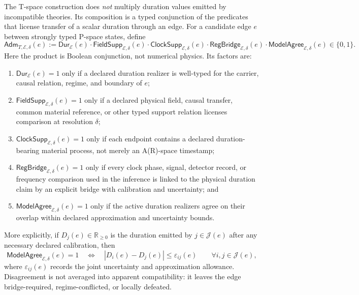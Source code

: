 \documentclass[11pt]{article}
\theoremstyle{definition}
\begin{document}
The T-space construction does \emph{not} multiply duration values emitted by
incompatible theories. Its composition is a typed conjunction of the predicates
that license transfer of a scalar duration through an edge. For a candidate edge
$e$ between strongly typed P-space states, define
\begin{equation}
\mathsf{Adm}_{T,\mathcal E,\delta}(e)
:=
\mathsf{Dur}_{\mathcal E}(e)
\cdot
\mathsf{FieldSupp}_{\mathcal E,\delta}(e)
\cdot
\mathsf{ClockSupp}_{\mathcal E,\delta}(e)
\cdot
\mathsf{RegBridge}_{\mathcal E,\delta}(e)
\cdot
\mathsf{ModelAgree}_{\mathcal E,\delta}(e)
\in\{0,1\}.
\label{eq:tspace-admissibility-product}
\end{equation}
Here the product is Boolean conjunction, not numerical physics. Its factors are:
\begin{enumerate}
\item $\mathsf{Dur}_{\mathcal E}(e)=1$ only if a declared duration realizer is
well-typed for the carrier, causal relation, regime, and boundary of $e$;
\item $\mathsf{FieldSupp}_{\mathcal E,\delta}(e)=1$ only if a declared physical
field, causal transfer, common material reference, or other typed support relation
licenses comparison at resolution $\delta$;
\item $\mathsf{ClockSupp}_{\mathcal E,\delta}(e)=1$ only if each endpoint contains
a declared duration-bearing material process, not merely an A(R)-space timestamp;
\item $\mathsf{RegBridge}_{\mathcal E,\delta}(e)=1$ only if every clock phase,
signal, detector record, or frequency comparison used in the inference is linked
to the physical duration claim by an explicit bridge with calibration and
uncertainty; and
\item $\mathsf{ModelAgree}_{\mathcal E,\delta}(e)=1$ only if the active duration
realizers agree on their overlap within declared approximation and uncertainty
bounds.
\end{enumerate}

More explicitly, if $D_j(e)\in\mathbb R_{\geq 0}$ is the duration emitted by
$j\in\mathcal J(e)$ after any necessary declared calibration, then
\begin{equation}
\mathsf{ModelAgree}_{\mathcal E,\delta}(e)=1
\quad\Longleftrightarrow\quad
\left|D_i(e)-D_j(e)\right|\leq\varepsilon_{ij}(e)
\qquad\forall i,j\in\mathcal J(e),
\label{eq:tspace-model-agreement}
\end{equation}
where $\varepsilon_{ij}(e)$ records the joint uncertainty and approximation
allowance. Disagreement is not averaged into apparent compatibility: it leaves
the edge bridge-required, regime-conflicted, or locally defeated.
\end{document}
